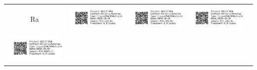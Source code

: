 \documentclass[10pt,notitlepage,letterpaper]{article}
\def\s{\phantom{xx}}
\def\w{1.27in}
\def\h{-0.030in}
\begin{document}
\begin{tabular}[t]{ c @{\s} c @{\s} c @{\s} c @{\s} c }
Ra} & \includegraphics[width=\w]{label_N75_211_Ra} & \includegraphics[width=\w]{label_N76_266_Ra} & \includegraphics[width=\w]{label_N77_282_Ra} \\[\h]
\includegraphics[width=\w]{label_N78_A009_Cl} & 

\end{tabular}
\end{document}
